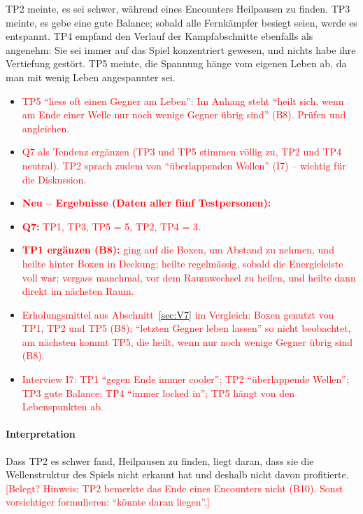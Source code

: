 \documentclass[../Main.tex]{subfiles}
\begin{document}
TP2 meinte, es sei schwer, während eines Encounters Heilpausen zu finden. TP3 meinte, es gebe eine gute Balance; sobald alle Fernkämpfer besiegt seien, werde es entspannt. TP4 empfand den Verlauf der Kampfabschnitte ebenfalls als angenehm: Sie sei immer auf das Spiel konzentriert gewesen, und nichts habe ihre Vertiefung gestört. TP5 meinte, die Spannung hänge vom eigenen Leben ab, da man mit wenig Leben angespannter sei.

\begin{itemize}[leftmargin=1.5cm]
    \item \textcolor{red}{TP5 \enquote{liess oft einen Gegner am Leben}: Im Anhang steht \enquote{heilt sich, wenn am Ende einer Welle nur noch wenige Gegner übrig sind} (B8). Prüfen und angleichen.}
    \item \textcolor{red}{Q7 als Tendenz ergänzen (TP3 und TP5 stimmen völlig zu, TP2 und TP4 neutral). TP2 sprach zudem von \enquote{überlappenden Wellen} (I7) -- wichtig für die Diskussion.}
\end{itemize}

\begin{itemize}[leftmargin=1.5cm]
    \item \textcolor{red}{\textbf{Neu -- Ergebnisse (Daten aller fünf Testpersonen):}}
    \item \textcolor{red}{\textbf{Q7:} TP1, TP3, TP5 = 5, TP2, TP4 = 3.}
    \item \textcolor{red}{\textbf{TP1 ergänzen (B8):} ging auf die Boxen, um Abstand zu nehmen, und heilte hinter Boxen in Deckung; heilte regelmässig, sobald die Energieleiste voll war; vergass manchmal, vor dem Raumwechsel zu heilen, und heilte dann direkt im nächsten Raum.}
    \item \textcolor{red}{Erholungsmittel aus Abschnitt~\ref{sec:V7} im Vergleich: Boxen genutzt von TP1, TP2 und TP5 (B8); \enquote{letzten Gegner leben lassen} so nicht beobachtet, am nächsten kommt TP5, die heilt, wenn nur noch wenige Gegner übrig sind (B8).}
    \item \textcolor{red}{Interview I7: TP1 \enquote{gegen Ende immer cooler}; TP2 \enquote{überlappende Wellen}; TP3 gute Balance; TP4 \enquote{immer locked in}; TP5 hängt von den Lebenspunkten ab.}
\end{itemize}

\paragraph{Interpretation}
Dass TP2 es schwer fand, Heilpausen zu finden, liegt daran, dass sie die Wellenstruktur des Spiels nicht erkannt hat und deshalb nicht davon profitierte. \textcolor{red}{[Belegt? Hinweis: TP2 bemerkte das Ende eines Encounters nicht (B10). Sonst vorsichtiger formulieren: \enquote{könnte daran liegen}.]}
\end{document}
